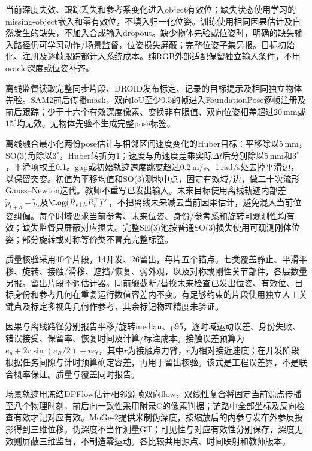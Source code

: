 当前深度失效、跟踪丢失和参考系变化进入object有效位；缺失状态使用学习的missing-object嵌入和零有效位，不填入归一化位姿。训练使用相同因果估计及自然发生的缺失，不加入合成输入dropout。缺少物体先验或位姿时，明确的缺失输入路径仍可学习动作/场景监督，位姿损失屏蔽；完整位姿子集另报。目标初始化、注册及逐帧跟踪都计入系统成本。纯RGB外部适配保留独立输入条件，不用oracle深度或位姿补齐。

离线监督读取完整同步片段、DROID发布标定、记录的目标提示及相同独立物体先验。SAM2前后传播mask，双向IoU至少0.5的帧进入FoundationPose逐帧注册及前后跟踪；少于十六个有效深度像素、变换非有限值、双向位姿相差超过20\,mm或$15^\circ$均无效。无物体先验不生成完整pose标签。

离线融合最小化两份pose估计与相邻区间速度变化的Huber目标：平移除以5\,mm，SO(3)角除以$3^\circ$，Huber转折为1；速度与角速度差乘实际$\Delta t$后分别除以5\,mm和$3^\circ$，平滑项权重0.1。gap或初始轨迹速度跳变超过0.2\,m/s、1\,rad/s处去掉平滑边，以保留突变。初值为平移均值和SO(3)测地中点，固定有效域/边，做二十次流形Gauss--Newton迭代。教师不重写已发出输入。未来目标使用离线轨迹内部差$\tilde p_{t+h}-\tilde p_t$及$\Log(\tilde R_{t+h}\tilde R_t^\top)^\vee$，不把离线未来减去当前因果估计，避免混入当前位姿纠偏。每个时域要求当前参考、未来位姿、身份/参考系和旋转可观测性均有效；缺失监督只屏蔽对应损失。完整SE(3)池按普通SO(3)损失使用可观测刚体位姿；部分旋转或对称等价类不冒充完整标签。

质量核验采用40个片段，14开发、26留出，每片五个锚点。七类覆盖静止、平滑平移、旋转、接触/滑移、遮挡/恢复、弱外观，以及对称或刚性关节部件，各层数量另报。留出片段不调估计器。同前缀截断/替换未来检查已发出位姿、有效位、目标身份和参考几何在重复运行数值容差内不变。有足够约束的片段使用独立人工关键点及标定多视角几何作参考，其余标记物理精度未验证。

因果与离线路径分别报告平移/旋转median、p95，逐时域运动误差、身份失败、错误接受、保留率、恢复时间及计算/标注成本。接触误差预算为$e_p+2r\sin(e_R/2)+v e_t$，其中$r$为接触点力臂，$v$为相对接近速度；在开发阶段根据任务间隙与计时预算确定容差，再用于留出核验。该式是工程误差界，不是联合概率保证。质量与覆盖同时报告。

场景轨迹用冻结DPFlow估计相邻源帧双向flow，双线性复合将固定当前源点传播至八个物理时刻\cite{dpflow}，前后向一致性采用附录C的像素判据；链路中全部坐标及反向检查有效才记对应有效。MoGe-2提供米制伪深度\cite{moge2}，按缩放后的内参与发布外参反投影得到三维位移。伪深度不当作测量GT；可见性与对应有效性分别保存，深度无效则屏蔽三维监督，不制造零运动。各比较共用源点、时间映射和教师版本。




